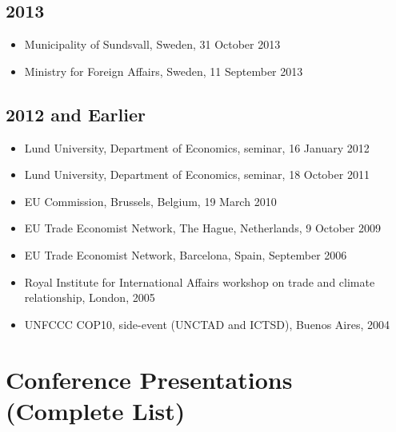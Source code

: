 \documentclass[11pt,a4paper]{article}
\newcommand{\cventry}[1]{\item #1}
\begin{document}
\subsection{2013}
\begin{itemize}
  \cventry{Municipality of Sundsvall, Sweden, 31 October 2013}
  \cventry{Ministry for Foreign Affairs, Sweden, 11 September 2013}
\end{itemize}

\subsection{2012 and Earlier}
\begin{itemize}
  \cventry{Lund University, Department of Economics, seminar, 16 January 2012}
  \cventry{Lund University, Department of Economics, seminar, 18 October 2011}
  \cventry{EU Commission, Brussels, Belgium, 19 March 2010}
  \cventry{EU Trade Economist Network, The Hague, Netherlands, 9 October 2009}
  \cventry{EU Trade Economist Network, Barcelona, Spain, September 2006}
  \cventry{Royal Institute for International Affairs workshop on trade and climate relationship, London, 2005}
  \cventry{UNFCCC COP10, side-event (UNCTAD and ICTSD), Buenos Aires, 2004}
\end{itemize}



\section{Conference Presentations (Complete List)}
\end{document}

